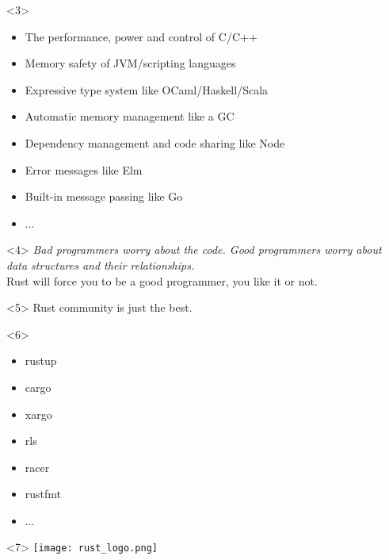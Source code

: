 \begin{frame}{\insertsection}
\begin{columns}
\begin{column}{.6\textwidth}
      \begin{onlyenv}<3>%
        \begin{itemize}
        \item The performance, power and control of C/C++
        \item Memory safety of JVM/scripting languages
        \item Expressive type system like OCaml/Haskell/Scala
        \item Automatic memory management like a GC
        \item Dependency management and code sharing like Node
        \item Error messages like Elm
        \item Built-in message passing like Go
        \item ...
        \end{itemize}
      \end{onlyenv}

      \begin{onlyenv}<4>%
        \textit{Bad programmers worry about the code. Good programmers worry
          about data structures and their relationships.}\\[12pt]

        Rust will force you to be a good programmer, you like it or not.
      \end{onlyenv}

      \begin{onlyenv}<5>%
        Rust community is just the best.
      \end{onlyenv}

      \begin{onlyenv}<6>%
        \begin{itemize}
        \item rustup
        \item cargo
        \item xargo
        \item rls
        \item racer
        \item rustfmt
        \item ...
        \end{itemize}
      \end{onlyenv}

      \begin{onlyenv}<7>%
        \center%
        \texttt{[image: rust\_logo.png]}%
      \end{onlyenv}
    \end{column}
  \end{columns}


\end{frame}
